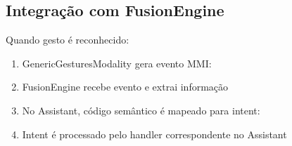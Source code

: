 \documentclass{report}
\begin{document}

\subsection{Integração com FusionEngine}

Quando gesto é reconhecido:

\begin{enumerate}
    \item GenericGesturesModality gera evento MMI:

    \item FusionEngine recebe evento e extrai informação

    \item No Assistant, código semântico é mapeado para intent:

    \item Intent é processado pelo handler correspondente no Assistant
\end{enumerate}
\end{document}
